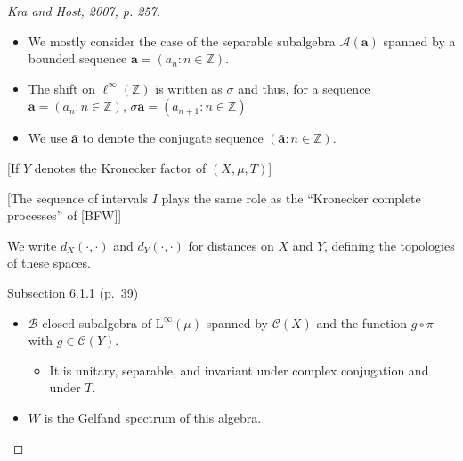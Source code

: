 \documentclass[
  british,
]{article}
\providecommand{\tightlist}{%
  \setlength{\itemsep}{0pt}\setlength{\parskip}{0pt}}
\theoremstyle{plain}
\theoremstyle{definition}
\theoremstyle{plain}
\theoremstyle{remark}
\newcommand{\Measure}{{\mu}}
\begin{document}
\begin{proof}[{Kra and Host, 2007, p. 257}]
\begin{itemize}
\begin{itemize}
\begin{itemize}
      \begin{itemize}
      \tightlist
      \item
        invariant under the shift
      \item
        invariant under complex conjugation
      \item
        closed in \(\ell^\infty(\mathbb{Z})\)
      \item
        {[}separable{]} for the uniform norm \(||\cdot||_\infty\)
      \end{itemize}
    \item
      We mostly consider the case of the separable subalgebra
      \(\mathcal{A}(\boldsymbol{a})\) spanned by a bounded sequence
      \(\boldsymbol{a}=(a_n:n\in\mathbb{Z})\).
    \item
      The shift on \(\ell^\infty(\mathbb{Z})\) is written as \(\sigma\)
      and thus, for a sequence \(\boldsymbol{a}=(a_n:n\in\mathbb{Z})\),
      \(\sigma\boldsymbol{a}=(a_{n+1}:n\in\mathbb{Z})\)
    \item
      We use \(\bar{\boldsymbol{a}}\) to denote the conjugate sequence
      \((\bar{\boldsymbol{a}}:n\in\mathbb{Z})\).
    \end{itemize}
  \end{itemize}
\end{itemize}

{[}If \(Y\) denotes the Kronecker factor of \((X,\Measure,T)\){]}

{[}The sequence of intervals \(I\) plays the same role as the
``Kronecker complete processes'' of {[}BFW{]}{]}

We write \(d_X(\cdot,\cdot)\) and \(d_Y(\cdot,\cdot)\) for distances on
\(X\) and \(Y\), defining the topologies of these spaces.

Subsection 6.1.1 (p.~39)

\begin{itemize}
\tightlist
\item
  \(\mathcal{B}\) closed subalgebra of \(\text{L}^\infty(\Measure)\)
  spanned by \(\mathcal{C}(X)\) and the function \(g\circ\pi\) with
  \(g\in\mathcal{C}(Y)\).

  \begin{itemize}
  \tightlist
  \item
    It is unitary, separable, and invariant under complex conjugation
    and under \(T\).
  \end{itemize}
\item
  \(W\) is the Gelfand spectrum of this algebra.


\end{itemize}
\end{proof}
\end{document}
